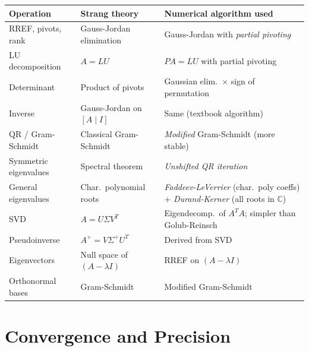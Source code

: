 \documentclass[12pt, a4paper]{article}
\newcommand{\C}{\mathbb{C}}
\begin{document}
\begin{center}
\small
\renewcommand{\arraystretch}{1.5}
\begin{tabular}{p{3.8cm} p{3.3cm} p{6.8cm}}
\toprule
\textbf{Operation} & \textbf{Strang theory} & \textbf{Numerical algorithm used} \\
\midrule
RREF, pivots, rank & Gauss-Jordan elimination & Gauss-Jordan with \emph{partial pivoting} \\
\hline
LU decomposition & $A = LU$ & $PA = LU$ with partial pivoting \\
\hline
Determinant & Product of pivots & Gaussian elim.\ $\times$ sign of permutation \\
\hline
Inverse & Gauss-Jordan on $[A \mid I]$ & Same (textbook algorithm) \\
\hline
QR / Gram-Schmidt & Classical Gram-Schmidt & \emph{Modified} Gram-Schmidt (more stable) \\
\hline
Symmetric eigenvalues & Spectral theorem & \emph{Unshifted QR iteration} \\
\hline
General eigenvalues & Char.\ polynomial roots & \emph{Faddeev-LeVerrier} (char.\ poly coeffs) + \emph{Durand-Kerner} (all roots in $\C$) \\
\hline
SVD & $A = U\Sigma V^T$ & Eigendecomp.\ of $A^TA$; simpler than Golub-Reinsch \\
\hline
Pseudoinverse & $A^+ = V\Sigma^+ U^T$ & Derived from SVD \\
\hline
Eigenvectors & Null space of $(A-\lambda I)$ & RREF on $(A - \lambda I)$ \\
\hline
Orthonormal bases & Gram-Schmidt & Modified Gram-Schmidt \\
\bottomrule
\end{tabular}
\end{center}

\section{Convergence and Precision}
\end{document}
